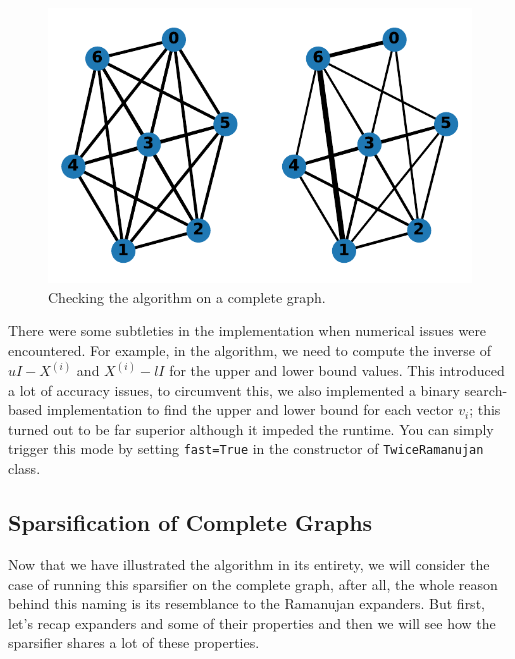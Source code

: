 \documentclass[
  letterpaper,
  DIV=11,
  numbers=noendperiod]{scrartcl}
\theoremstyle{plain}
\theoremstyle{plain}
\theoremstyle{plain}
\theoremstyle{definition}
\theoremstyle{plain}
\theoremstyle{remark}
\begin{document}
\begin{figure}[H]

{\centering \includegraphics{index_files/figure-pdf/fig-barbell-output-3.pdf}

}
\caption{Checking the algorithm on a complete graph.}

\label{fig-dumbell}
\end{figure}

There were some subtleties in the implementation when numerical issues
were encountered. For example, in the algorithm, we need to compute the
inverse of \(uI - X^{(i)}\) and \(X^{(i)} - l I\) for the upper and
lower bound values. This introduced a lot of accuracy issues, to
circumvent this, we also implemented a binary search-based
implementation to find the upper and lower bound for each vector
\(v_i\); this turned out to be far superior although it impeded the
runtime. You can simply trigger this mode by setting \texttt{fast=True}
in the constructor of \texttt{TwiceRamanujan} class.

\hypertarget{sparsification-of-complete-graphs}{%
\subsection{Sparsification of Complete
Graphs}\label{sparsification-of-complete-graphs}}

Now that we have illustrated the algorithm in its entirety, we will
consider the case of running this sparsifier on the complete graph,
after all, the whole reason behind this naming is its resemblance to the
Ramanujan expanders. But first, let's recap expanders and some of their
properties and then we will see how the sparsifier shares a lot of these
properties.
\end{document}

